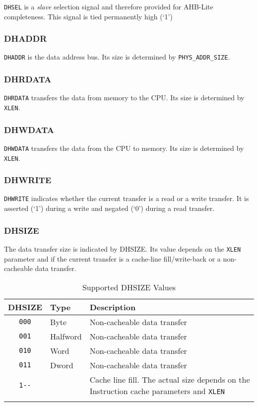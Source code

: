 \texttt{DHSEL} is a \emph{slave} selection signal and therefore provided for AHB-Lite
completeness. This signal is tied permanently high (`1')

\subsubsection{DHADDR}\label{dhaddr}

\texttt{DHADDR} is the data address bus. Its size is determined by
\texttt{PHYS\_ADDR\_SIZE}.

\subsubsection{DHRDATA}\label{dhrdata}

\texttt{DHRDATA} transfers the data from memory to the CPU. Its size is
determined by \texttt{XLEN}.

\subsubsection{DHWDATA}\label{dhwdata}

\texttt{DHWDATA} transfers the data from the CPU to memory. Its size is
determined by \texttt{XLEN}.

\subsubsection{DHWRITE}\label{dhwrite}

\texttt{DHWRITE} indicates whether the current transfer is a read or a write
transfer. It is asserted (`1') during a write and negated (`0') during a
read transfer.

\subsubsection{DHSIZE}\label{dhsize}

The data transfer size is indicated by DHSIZE. Its value depends on the
\texttt{XLEN} parameter and if the current transfer is a cache-line
fill/write-back or a non-cacheable data transfer.

\begin{longtable}[]{@{}clp{7.5cm}@{}}
\toprule
DHSIZE & Type & Description\tabularnewline
\midrule
\endhead
\texttt{000} & Byte & Non-cacheable data transfer\tabularnewline
\texttt{001} & Halfword & Non-cacheable data transfer\tabularnewline
\texttt{010} & Word & Non-cacheable data transfer\tabularnewline
\texttt{011} & Dword & Non-cacheable data transfer\tabularnewline
\texttt{1-\/-} & & Cache line fill. The actual size depends on the Instruction
cache parameters and \texttt{XLEN}\tabularnewline
\bottomrule
\caption{Supported DHSIZE Values}
\end{longtable}

